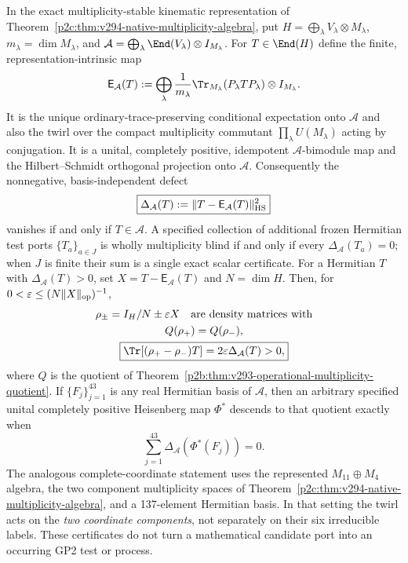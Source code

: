 \documentclass[12pt,a4paper]{article}
\begin{document}
\begin{theorem}
\label{p2c:thm:v295-complete-port-twirl}
In the exact multiplicity-stable kinematic representation of
Theorem~\ref{p2c:thm:v294-native-multiplicity-algebra}, put
$H=\bigoplus_{\lambda}V_\lambda\otimes M_\lambda$,
$m_\lambda=\dim M_\lambda$, and
$\mathcal A=\bigoplus_\lambda\End(V_\lambda)\otimes I_{M_\lambda}$.
For $T\in\End(H)$ define the finite, representation-intrinsic map
\[
 \mathsf E_{\mathcal A}(T)
 :=\bigoplus_\lambda
 \frac{1}{m_\lambda}\Tr_{M_\lambda}
 (P_\lambda T P_\lambda)\otimes I_{M_\lambda}.
\]
It is the unique ordinary-trace-preserving conditional expectation onto
$\mathcal A$ and also the twirl over the compact multiplicity commutant
$\prod_\lambda U(M_\lambda)$ acting by conjugation.  It is a unital,
completely positive, idempotent $\mathcal A$-bimodule map and the
Hilbert--Schmidt orthogonal projection onto $\mathcal A$.
Consequently the nonnegative, basis-independent defect
\[
 \boxed{\Delta_{\mathcal A}(T)
 :=\|T-\mathsf E_{\mathcal A}(T)\|_{\rm HS}^2}
\]
vanishes if and only if $T\in\mathcal A$.  A specified collection of
additional frozen Hermitian test ports $\{T_a\}_{a\in J}$ is wholly
multiplicity blind if and only if every $\Delta_{\mathcal A}(T_a)=0$;
when $J$ is finite their sum is a single exact scalar certificate.
For a Hermitian $T$ with $\Delta_{\mathcal A}(T)>0$, set
$X=T-\mathsf E_{\mathcal A}(T)$ and $N=\dim H$. Then, for
$0<\varepsilon\leq (N\|X\|_{\rm op})^{-1}$,
\[
 \begin{gathered}
 \rho_\pm=I_H/N\pm\varepsilon X
 \quad\text{are density matrices with}\\
 Q(\rho_+)=Q(\rho_-),\\
 \boxed{\Tr[(\rho_+-\rho_-)T]
 =2\varepsilon\Delta_{\mathcal A}(T)>0,}
 \end{gathered}
\]
where $Q$ is the quotient of
Theorem~\ref{p2b:thm:v293-operational-multiplicity-quotient}.
If $\{F_j\}_{j=1}^{43}$ is any real Hermitian basis of $\mathcal A$,
then an arbitrary specified unital completely positive Heisenberg map
$\Phi^*$ descends to that quotient exactly when
\[
 \boxed{\sum_{j=1}^{43}
 \Delta_{\mathcal A}(\Phi^*(F_j))=0.}
\]
The analogous complete-coordinate statement uses the represented
$M_{11}\oplus M_4$ algebra, the two component multiplicity spaces of
Theorem~\ref{p2c:thm:v294-native-multiplicity-algebra}, and a
137-element Hermitian basis. In that setting the twirl acts on the
\emph{two coordinate components}, not separately on their six
irreducible labels. These certificates do not turn a mathematical
candidate port into an occurring GP2 test or process.
\end{theorem}
\end{document}

